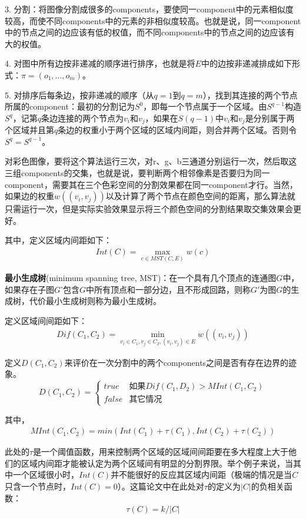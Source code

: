 \documentclass[12pt]{article}
\begin{document}
3. 分割：将图像分割成很多的components，要使同一component中的元素相似度较高，而使不同components中的元素的非相似度较高。也就是说，同一component中的节点之间的边应该有低的权值，而不同components中的节点之间的边应该有大的权值。

4. 对图中所有边按非递减的顺序进行排序，也就是将$E$中的边按非递减排成如下形式：$\pi = (o_1, \ldots, o_m)$。

5. 对排序后每条边，按非递减的顺序（从$q=1$到$q=m$），找到其连接的两个节点所属的component：最初的分割记为$S^0$，即每一个节点属于一个区域。由$S^{q-1}$构造$S^q$，记第$q$条边连接的两个节点为$v_i$和$v_j$，如果在$S(q-1)$中$v_i$和$v_j$是分别属于两个区域并且第$q$条边的权重小于两个区域的区域内间距，则合并两个区域。否则令$S^q = S^{q-1}$。

对彩色图像，要将这个算法运行三次，对r、g、b三通道分别运行一次，然后取这三组components的交集，也就是说，要判断两个相邻像素是否要归为同一component，需要其在三个色彩空间的分割效果都在同一component才行。当然，如果边的权重$w((v_i, v_j))$以及计算了两个节点在颜色空间的距离，那么算法就只需运行一次，但是实际实验效果显示将三个颜色空间的分割结果取交集效果会更好。


其中，定义区域内间距如下：
\begin{align}
Int(C) = \max_{c \in MST(C, E)}w(c)
\end{align}

\textbf{最小生成树}(minimum spanning tree, MST)：在一个具有几个顶点的连通图$G$中，如果存在子图$G$'包含$G$中所有顶点和一部分边，且不形成回路，则称$G'$为图$G$的生成树，代价最小生成树则称为最小生成树。

定义区域间间距如下：
\begin{align}
Dif(C_1, C_2) = \min_{v_i \in C_1, v_j \in C_2, (v_i, v_j)\in E}w((v_i, v_j))
\end{align}

定义$D(C_1, C_2)$来评价在一次分割中的两个components之间是否有存在边界的迹象。
\begin{equation}
 D(C_1, C_2)= \left\{
    \begin{array}{rl}
      true & \text{如果} Dif(C_1, D_2) > MInt(C_1, C_2)\\
      false & \text{其它情况}
    \end{array} \right.
\end{equation}

其中，
\begin{align}
MInt(C_1, C_2) = min(Int(C_1)+\tau(C_1), Int(C_2)+\tau(C_2))
\end{align}

此处的$\tau$是一个阈值函数，用来控制两个区域的区域间间距要在多大程度上大于他们的区域内间距才能被认定为两个区域间有明显的分割界限。举个例子来说，当其中一个区域很小时，$Int(C)$并不能很好的反应其区域内间距（极端的情况是当$C$只含一个节点时，$Int(C)=0$）。这篇论文中在此处对$\tau$的定义为$|C|$的负相关函数：
\begin{align}
\tau(C) = k/|C|
\end{align}
\end{document}
